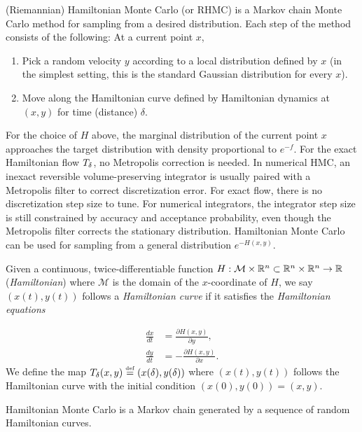 (Riemannian) Hamiltonian Monte Carlo (or RHMC) \cite{Neal1996,Neal2012,Girolami2009,Girolami2011}
is a Markov chain Monte Carlo method for sampling from a desired distribution.
Each step of the method consists of the following: At a current point
$x$,
\begin{enumerate}
\item Pick a random velocity $y$ according to a local distribution defined
by $x$ (in the simplest setting, this is the standard Gaussian distribution
for every $x$).
\item Move along the Hamiltonian curve defined by Hamiltonian dynamics at
$(x,y)$ for time (distance) $\delta$.
\end{enumerate}
For the choice of $H$ above, the marginal distribution of the current
point $x$ approaches the target distribution with density proportional
to $e^{-f}$. For the exact Hamiltonian flow $T_{\delta}$, no Metropolis
correction is needed. In numerical HMC, an inexact reversible volume-preserving
integrator is usually paired with a Metropolis filter to correct discretization
error. For exact flow, there is no discretization step size to tune.
For numerical integrators, the integrator step size is still constrained
by accuracy and acceptance probability, even though the Metropolis
filter corrects the stationary distribution. Hamiltonian Monte Carlo
can be used for sampling from a general distribution $e^{-H(x,y)}$. 
\begin{defn}
Given a continuous, twice-differentiable function $H:\mathcal{M}\times\mathbb{R}^{n}\subset\mathbb{R}^{n}\times\mathbb{R}^{n}\rightarrow\mathbb{R}$
(\emph{Hamiltonian}) where $\mathcal{M}$ is the domain of the $x$-coordinate
of $H$, we say $(x(t),y(t))$ follows a \emph{Hamiltonian curve}
if it satisfies the \emph{Hamiltonian equations}

\begin{align}
\frac{dx}{dt} & =\frac{\partial H(x,y)}{\partial y},\nonumber \\
\frac{dy}{dt} & =-\frac{\partial H(x,y)}{\partial x}.\label{eq:ham}
\end{align}
We define the map $T_{\delta}(x,y)\stackrel{\mathrm{{\scriptscriptstyle def}}}{=}(x(\delta),y(\delta))$ where
$(x(t),y(t))$ follows the Hamiltonian curve with the initial condition
$(x(0),y(0))=(x,y).$
\end{defn}

Hamiltonian Monte Carlo is a Markov chain generated by a sequence
of random Hamiltonian curves.

